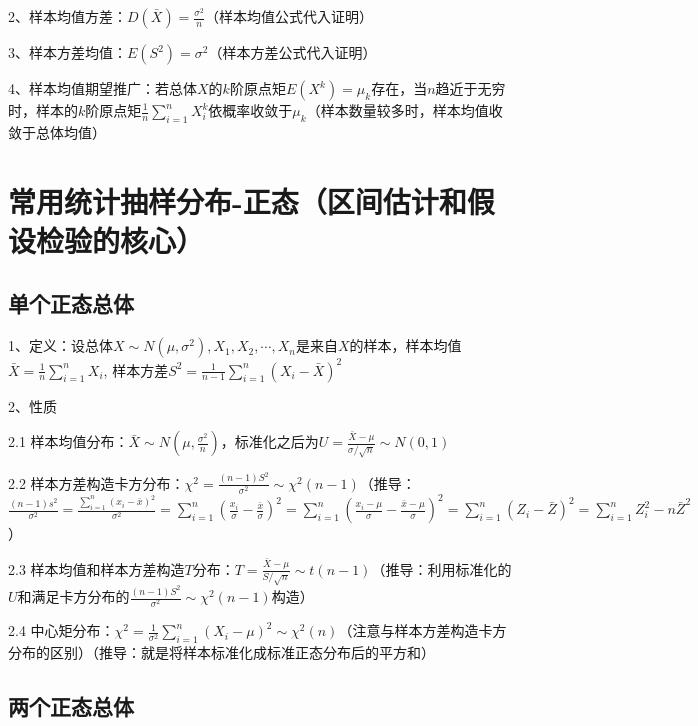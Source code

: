 2、样本均值方差：$D(\bar{X}) = \frac{\sigma^2}{n}$（样本均值公式代入证明）

3、样本方差均值：$E(S^2) = \sigma^2$（样本方差公式代入证明）

4、样本均值期望推广：若总体$X$的$k$阶原点矩$E(X^k)=\mu_k$存在，当$n$趋近于无穷时，样本的$k$阶原点矩$\frac{1}{n}\sum_{i=1}^{n}X_i^k$依概率收敛于$\mu_k$（样本数量较多时，样本均值收敛于总体均值）

\section{常用统计抽样分布-正态（区间估计和假设检验的核心）}



\subsection{单个正态总体}

1、定义：设总体$X \sim N\left(\mu, \sigma^{2}\right), X_{1}, X_{2},\cdots, X_{n}$是来自$X$的样本，样本均值$\bar{X}=\frac{1}{n} \sum_{i=1}^{n} X_{i}$, 样本方差$S^{2}=\frac{1}{n-1} \sum_{i=1}^{n}\left(X_{i}-\bar{X}\right)^{2}$

2、性质

2.1 样本均值分布：$\bar{X} \sim N\left(\mu, \frac{\sigma^{2}}{n}\right)$，标准化之后为$U=\frac{\bar{X}-\mu}{\sigma / \sqrt{n}} \sim N(0,1)$

2.2 样本方差构造卡方分布：$\chi^{2}=\frac{(n-1) S^{2}}{\sigma^{2}} \sim \chi^{2}(n-1)$（推导：$\frac{(n-1) s^{2}}{\sigma^{2}} =\frac{\sum_{i=1}^{n}\left(x_{i}-\bar{x}\right)^{2}}{\sigma^{2}} =\sum_{i=1}^{n}\left(\frac{x_{i}}{\sigma}-\frac{\bar{x}}{\sigma}\right)^{2} =\sum_{i=1}^{n}\left(\frac{x_{i}-\mu}{\sigma}-\frac{\bar{x}-\mu}{\sigma}\right)^{2} =\sum_{i=1}^{n}\left(Z_{i}-\bar{Z}\right)^{2} =\sum_{i=1}^{n} Z_{i}^{2}-n \bar{Z}^{2}$）

2.3 样本均值和样本方差构造$T$分布：$T=\frac{\bar{X}-\mu}{S / \sqrt{n}} \sim t(n-1)$（推导：利用标准化的$U$和满足卡方分布的$\frac{(n-1) S^{2}}{\sigma^{2}} \sim \chi^{2}(n-1)$构造）

2.4 中心矩分布：$\chi^{2}=\frac{1}{\sigma^{2}} \sum_{i=1}^{n}\left(X_{i}-\mu\right)^{2} \sim \chi^{2}(n)$（注意与样本方差构造卡方分布的区别）（推导：就是将样本标准化成标准正态分布后的平方和）



\subsection{两个正态总体}

